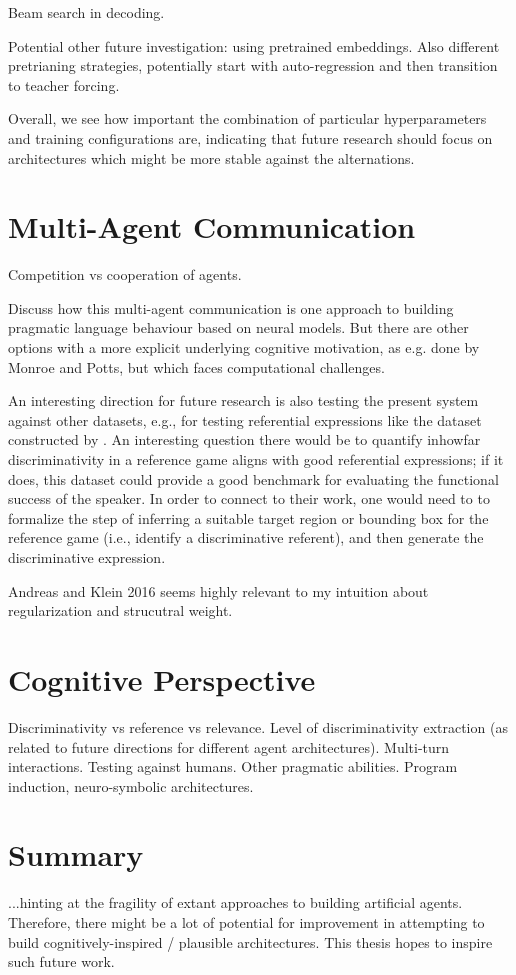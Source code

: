 Beam search in decoding.

Potential other future investigation: using pretrained embeddings.
Also different pretrianing strategies, potentially start with auto-regression and then transition to teacher forcing. 

Overall, we see how important the combination of particular hyperparameters and training configurations are, indicating that future research should focus on architectures which might be more stable against the alternations. 

\section{Multi-Agent Communication}

Competition vs cooperation of agents. 

Discuss how this multi-agent communication is one approach to building pragmatic language behaviour based on neural models. But there are other options with a more explicit underlying cognitive motivation, as e.g. done by Monroe and Potts, but which faces computational challenges. 


An interesting direction for future research is also testing the present system against other datasets, e.g., for testing referential expressions like the dataset constructed by \cite{mao2016generation}. An interesting question there would be to quantify inhowfar discriminativity in a reference game aligns with good referential expressions; if it does, this dataset could provide a good benchmark for evaluating the functional success of the speaker. In order to connect to their work, one would need to to formalize the step of inferring a suitable target region or bounding box for the reference game (i.e., identify a discriminative referent), and then generate the discriminative expression. 

Andreas and Klein 2016 seems highly relevant to my intuition about regularization and strucutral weight. 


\section{Cognitive Perspective}
Discriminativity vs reference vs relevance. Level of discriminativity extraction (as related to future directions for different agent architectures). Multi-turn interactions. Testing against humans. Other pragmatic abilities. 
Program induction, neuro-symbolic architectures. 

\section{Summary}
...hinting at the fragility of extant approaches to building artificial agents. Therefore, there might be a lot of potential for improvement in attempting to build cognitively-inspired / plausible architectures. This thesis hopes to inspire such future work. 